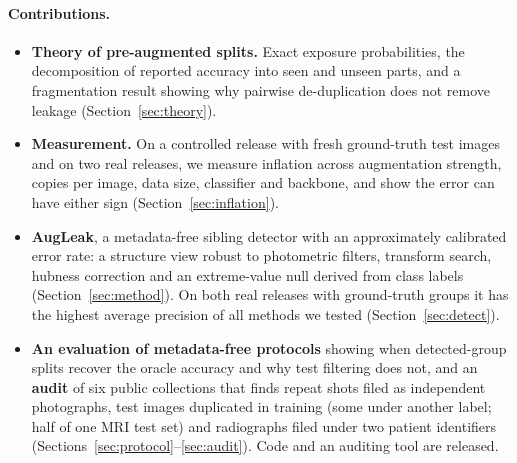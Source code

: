 \paragraph{Contributions.}
\begin{itemize}[leftmargin=1.2em,itemsep=1pt,topsep=2pt]
\item \textbf{Theory of pre-augmented splits.} Exact exposure probabilities, the decomposition of reported accuracy into seen and unseen parts, and a fragmentation result showing why pairwise de-duplication does not remove leakage (Section~\ref{sec:theory}).
\item \textbf{Measurement.} On a controlled release with fresh ground-truth test images and on two real releases, we measure inflation across augmentation strength, copies per image, data size, classifier and backbone, and show the error can have either sign (Section~\ref{sec:inflation}).
\item \textbf{AugLeak}, a metadata-free sibling detector with an approximately calibrated error rate: a structure view robust to photometric filters, transform search, hubness correction and an extreme-value null derived from class labels (Section~\ref{sec:method}). On both real releases with ground-truth groups it has the highest average precision of all methods we tested (Section~\ref{sec:detect}).
\item \textbf{An evaluation of metadata-free protocols} showing when detected-group splits recover the oracle accuracy and why test filtering does not, and an \textbf{audit} of six public collections that finds repeat shots filed as independent photographs, test images duplicated in training (some under another label; half of one MRI test set) and radiographs filed under two patient identifiers (Sections~\ref{sec:protocol}--\ref{sec:audit}). Code and an auditing tool are released.
\end{itemize}
